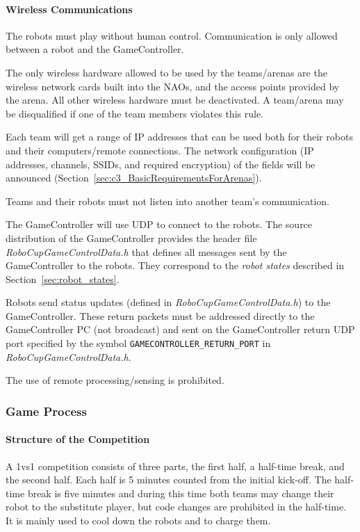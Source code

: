 \paragraph{Wireless Communications}
\label{sec:wireless}
The robots must play without human control. Communication is only allowed between a robot and the GameController.

The only wireless hardware allowed to be used by the teams/arenas are the wireless network cards built into the NAOs, and the access points provided by the arena. All other wireless hardware must be deactivated. A team/arena may be disqualified if one of the team members violates this rule.

Each team will get a range of IP addresses that can be used both for their robots and their computers/remote connections. The network configuration (\eg IP addresses, channels, SSIDs, and required encryption) of the fields will be announced (\cf Section~\ref{sec:c3_BasicRequirementsForArenas}).

Teams and their robots must not listen into another team's communication.

The GameController will use UDP to connect to the robots. The source distribution of the GameController provides the header file \emph{RoboCupGameControlData.h} that defines all messages sent by the GameController to the robots. They correspond to the \emph{robot states} described in Section~\ref{sec:robot_states}.

Robots send status updates (defined in \emph{RoboCupGameControlData.h}) to the GameController. These return packets must be addressed directly to the GameController PC (\ie not broadcast) and sent on the GameController return UDP port specified by the symbol \verb!GAMECONTROLLER_RETURN_PORT! in \emph{RoboCupGameControlData.h}.

The use of remote processing/sensing is prohibited.

\newpage

\subsubsection{Game Process}
\label{sec:game_process}

\paragraph{Structure of the Competition}
\label{sec:game_struct}

A 1vs1 competition consists of three parts, the first half, a half-time break, and the second half. Each half is 5 minutes counted from the initial kick-off.
The half-time break is five minutes and during this time both teams may change their robot to the substitute player, but code changes are prohibited in the half-time. It is mainly used to cool down the robots and to charge them. 


